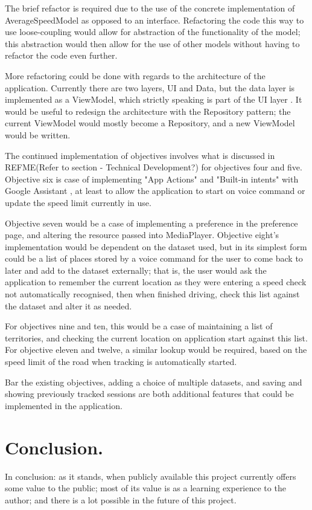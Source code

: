 \documentclass[11pt, a4paper, notitlepage]{report}
\begin{document}
The brief refactor is required due to the use of the concrete implementation of AverageSpeedModel as opposed to an interface. Refactoring the code this way to use loose-coupling would allow for abstraction of the functionality of the model; this abstraction would then allow for the use of other models without having to refactor the code even further.

More refactoring could be done with regards to the architecture of the application. Currently there are two layers, UI and Data, but the data layer is implemented as a ViewModel, which strictly speaking is part of the UI layer \citep{UILayerAndroid}. It would be useful to redesign the architecture with the Repository pattern; the current ViewModel would mostly become a Repository, and a new ViewModel would be written.

The continued implementation of objectives involves what is discussed in REFME(Refer to section - Technical Development?) for objectives four and five. Objective six is case of implementing "App Actions" and "Built-in intents" with Google Assistant \citep{appActionsBII}, at least to allow the application to start on voice command or update the speed limit currently in use.

Objective seven would be a case of implementing a preference in the preference page, and altering the resource passed into MediaPlayer. Objective eight's implementation would be dependent on the dataset used, but in its simplest form could be a list of places stored by a voice command for the user to come back to later and add to the dataset externally; that is, the user would ask the application to remember the current location as they were entering a speed check not automatically recognised, then when finished driving, check this list against the dataset and alter it as needed.

For objectives nine and ten, this would be a case of maintaining a list of territories, and checking the current location on application start against this list. For objective eleven and twelve, a similar lookup would be required, based on the speed limit of the road when tracking is automatically started.

Bar the existing objectives, adding a choice of multiple datasets, and saving and showing previously tracked sessions are both additional features that could be implemented in the application.

\section{Conclusion.}
In conclusion: as it stands, when publicly available this project currently offers some value to the public; most of its value is as a learning experience to the author; and there is a lot possible in the future of this project.
\end{document}
